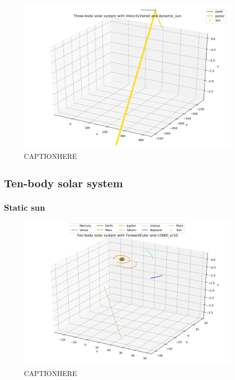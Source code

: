 \documentclass{article}
\begin{document}
    \begin{figure}[H]
        \centering
        \includegraphics[width = 11cm]{img/plot3D_S_E_J_V_dynamic_sun.png}
        \caption{CAPTIONHERE}
        \label{fig:plot3D_S_E_J_V_dynamic_sun}
    \end{figure}



\subsection{Ten-body solar system}

\subsubsection{Static sun}

    \begin{figure}[H]
        \centering
        \includegraphics[width = 11cm]{img/plot3D_10body_F_n3660_yr10.png}
        \caption{CAPTIONHERE}
        \label{fig:plot3D_10body_F_n3660_yr10}
    \end{figure}
\end{document}
